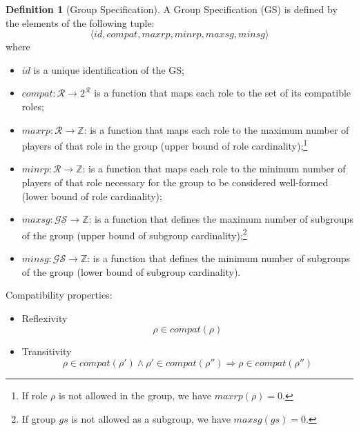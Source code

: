 \documentclass{article}
\newcommand{\set}[1]{\mathcal{#1}}
\theoremstyle{definition} \newtheorem{definition}{Definition}
\begin{document}
\begin{definition}[Group Specification]
  A Group Specification (GS) is defined by the elements of the following tuple: 
  \begin{displaymath}
    \langle id, compat, maxrp, minrp, maxsg, minsg \rangle    
  \end{displaymath}
  where 
  \begin{itemize}
  \item $id$ is a unique identification of the GS;
 \item $compat : \set{R} \to 2^{\mathcal{R}}$ is a
    function that maps each role to the set of its compatible roles;
  \item $maxrp : \mathcal{R} \to \mathbb{Z}$: is a function that maps
    each role to the maximum number of players of that role in the
    group (upper bound of role cardinality);\footnote{If role $\rho$
      is not allowed in the group, we have $maxrp(\rho) = 0$.}
  \item $minrp : \mathcal{R} \to \mathbb{Z}$: is a function
    that maps each role to the minimum number of players of that role
    necessary for the group to be considered well-formed (lower bound
    of role cardinality);
  \item $maxsg : \mathcal{GS} \to \mathbb{Z}$: is a function that
    defines the maximum number of subgroups of the group (upper bound of
    subgroup cardinality);\footnote{If group $gs$ is not allowed as
      a subgroup, we have $maxsg(gs) = 0$.}
  \item $minsg : \mathcal{GS} \to \mathbb{Z}$: is a function that
    defines the minimum number of subgroups of the group (lower bound of
    subgroup cardinality).
 \end{itemize} 

Compatibility properties:
\begin{itemize}
\item Reflexivity
  \begin{equation}
    \rho \in compat(\rho)
  \end{equation}

\item Transitivity
  \begin{equation}
    \rho \in compat(\rho') \land \rho' \in compat(\rho'') \Rightarrow \rho \in compat(\rho'')
  \end{equation}


\end{itemize}
\end{definition}
\end{document}
